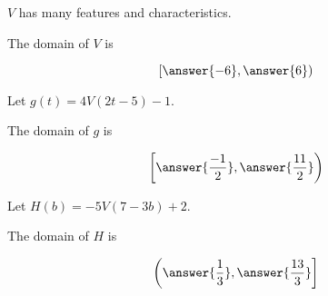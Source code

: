 \documentclass{ximera}
\begin{document}
\begin{exercise}
$V$ has many features and characteristics. \\






\begin{question}


The domain of $V$ is 

\[
\left[ \answer{-6}, \answer{6} \right)
\]


\end{question}








\begin{question}



Let $g(t) = 4 V(2t - 5) - 1$.



The domain of $g$ is 

\[
\left[ \answer{\frac{-1}{2}}, \answer{\frac{11}{2}} \right)
\]




\end{question}












\begin{question}



Let $H(b) = -5 V(7 - 3b) + 2$.



The domain of $H$ is 

\[
\left( \answer{\frac{1}{3}}, \answer{\frac{13}{3}} \right]
\]




\end{question}









\end{exercise}
\end{document}
